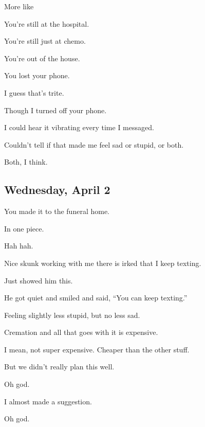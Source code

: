 {
More like

You're still at the hospital.

You're still just at chemo.

You're out of the house.

You lost your phone.

I guess that's trite.

Though I turned off your phone.

I could hear it vibrating every time
I messaged.

Couldn't tell if that made me feel
sad or stupid, or both.

Both, I think.

\newpage

\subsection*{Wednesday, April 2}\label{wednesday-april-2}

You made it to the funeral home.

In one piece.

Hah hah.

Nice skunk working with me there is
irked that I keep texting.

Just showed him this.

He got quiet and smiled and said,
``You can keep texting.''

Feeling slightly less stupid, but no
less sad.

Cremation and all that goes with it
is expensive.

I mean, not super expensive. Cheaper
than the other stuff.

But we didn't really plan this well.

Oh god.

I almost made a suggestion.

Oh god.

}
